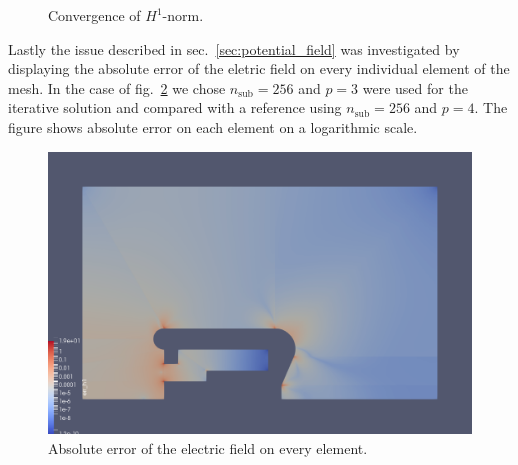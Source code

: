 \begin{figure}[H]
  \begin{center}
    
    \caption{Convergence of $H^1$-norm.}
    \label{fig:convergence_gradient}
  \end{center}
\end{figure}

Lastly the issue described in sec.~\ref{sec:potential_field} was investigated by displaying the absolute error of the eletric field on every individual element of the mesh. In the case of fig.~\ref{fig:error_elem} we chose $n_\mathrm{sub}=256$ and $p=3$ were used for the iterative solution and compared with a reference using $n_\mathrm{sub}=256$ and $p=4$.
The figure shows absolute error on each element on a logarithmic scale.

\begin{center}
\begin{figure}[H]
  \includegraphics[width=\textwidth]{figures/insulator/error_elem}
  \caption{Absolute error of the electric field on every element.}
  \label{fig:error_elem}
\end{figure}
\end{center}
